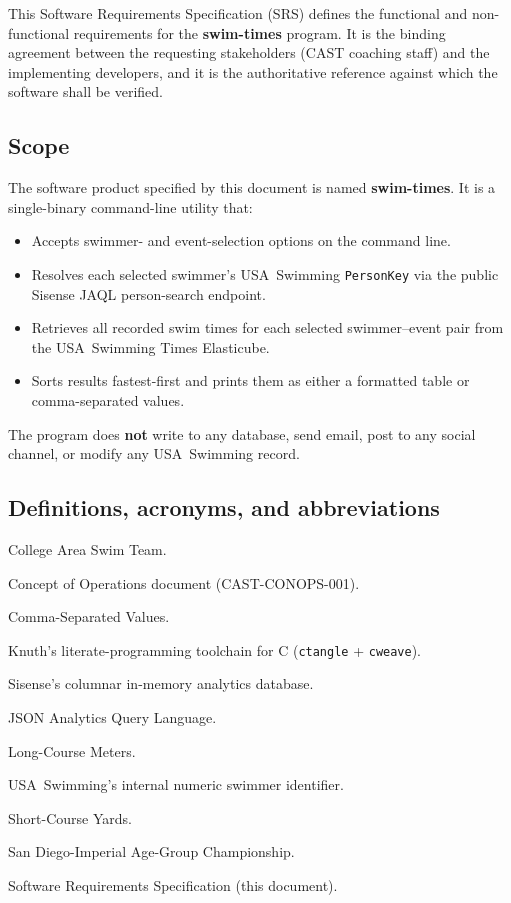 \documentclass[12pt]{article}
\newcommand{\code}[1]{\texttt{#1}}
\begin{document}
This Software Requirements Specification (SRS) defines the
functional and non-functional requirements for the
\textbf{swim-times} program.  It is the binding agreement between
the requesting stakeholders (CAST coaching staff) and the
implementing developers, and it is the authoritative reference
against which the software shall be verified.

\subsection{Scope}

The software product specified by this document is named
\textbf{swim-times}.  It is a single-binary command-line utility
that:

\begin{itemize}
  \item Accepts swimmer- and event-selection options on the command line.
  \item Resolves each selected swimmer's USA~Swimming \code{PersonKey}
        via the public Sisense JAQL person-search endpoint.
  \item Retrieves all recorded swim times for each selected
        swimmer--event pair from the USA~Swimming Times Elasticube.
  \item Sorts results fastest-first and prints them as either a
        formatted table or comma-separated values.
\end{itemize}

The program does \textbf{not} write to any database, send email,
post to any social channel, or modify any USA~Swimming record.

\subsection{Definitions, acronyms, and abbreviations}

\begin{description}[style=nextline,leftmargin=2.5cm,labelindent=0pt]
  \item[CAST] College Area Swim Team.
  \item[ConOps] Concept of Operations document
                (CAST-CONOPS-001).
  \item[CSV] Comma-Separated Values.
  \item[CWEB] Knuth's literate-programming toolchain for C
              (\code{ctangle} + \code{cweave}).
  \item[ElastiCube] Sisense's columnar in-memory analytics database.
  \item[JAQL] JSON Analytics Query Language.
  \item[LCM] Long-Course Meters.
  \item[PersonKey] USA~Swimming's internal numeric swimmer identifier.
  \item[SCY] Short-Course Yards.
  \item[SDI~AGC] San Diego-Imperial Age-Group Championship.
  \item[SRS] Software Requirements Specification (this document).
\end{description}
\end{document}
